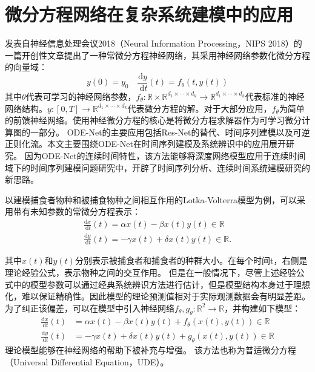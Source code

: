 \section{微分方程网络在复杂系统建模中的应用}
发表自神经信息处理会议2018（Neural Information Processing，NIPS 2018）的一篇开创性文章\cite{chen2018neural}提出了一种常微分方程神经网络，其采用神经网络参数化微分方程的向量域\cite{kidger2021}：
\begin{equation}
y(0)=y_0 \quad \frac{\mathrm{d} y}{\mathrm{~d} t}(t)=f_\theta(t, y(t))
\end{equation}
其中$\theta$代表可学习的神经网络参数，$f_\theta: \mathbb{R} \times \mathbb{R}^{d_1 \times \cdots \times d_k} \rightarrow \mathbb{R}^{d_1 \times \cdots \times d_k}$代表标准的神经网络结构。$y:[0, T] \rightarrow \mathbb{R}^{d_1 \times \cdots \times d_k}$代表微分方程的解。对于大部分应用，$f_\theta$为简单的前馈神经网络。使用神经微分方程的核心是将微分方程求解器作为可学习微分计算图的一部分。
ODE-Net的主要应用包括Res-Net的替代、时间序列建模以及可逆正则化流\cite{Grathwohl2019}。本文主要围绕ODE-Net在时间序列建模及系统辨识中的应用展开研究。
因为ODE-Net的连续时间特性，该方法能够将深度网络模型应用于连续时间域下的时间序列建模问题研究中，开辟了时间序列分析、连续时间系统建模研究的新思路。

以建模捕食者物种和被捕食物种之间相互作用的Lotka-Volterra模型为例，可以采用带有未知参数的常微分方程表示：
\begin{equation}
    \begin{gathered}
    \frac{\mathrm{d} x}{\mathrm{~d} t}(t)=\alpha x(t)-\beta x(t) y(t) \in \mathbb{R} \\
    \frac{\mathrm{d} y}{\mathrm{~d} t}(t)=-\gamma x(t)+\delta x(t) y(t) \in \mathbb{R} .
    \end{gathered}
    \label{equ:2_ode}
\end{equation}

其中$x(t)$和$y(t)$分别表示被捕食者和捕食者的种群大小。在每个时间t，右侧是理论经验公式，表示物种之间的交互作用。
但是在一般情况下，尽管上述经验公式中的模型参数可以通过经典系统辨识方法进行估计，但是模型结构本身过于理想化，难以保证精确性。因此模型的理论预测值相对于实际观测数据会有明显差距。为了纠正该偏差，可以在模型中引入神经网络$f_\theta, g_\theta: \mathbb{R}^2 \rightarrow \mathbb{R}$，并构建如下模型：
\begin{equation}
    \begin{aligned}
    \frac{\mathrm{d} x}{\mathrm{~d} t}(t) &=\alpha x(t)-\beta x(t) y(t)+f_\theta(x(t), y(t)) \in \mathbb{R} \\
    \frac{\mathrm{d} y}{\mathrm{~d} t}(t) &=-\gamma x(t)+\delta x(t) y(t)+g_\theta(x(t), y(t)) \in \mathbb{R}
    \end{aligned}
    \label{equ:2_node}
\end{equation}
理论模型能够在神经网络的帮助下被补充与增强。
该方法也称为普适微分方程（Universal Differential Equation，UDE）。

